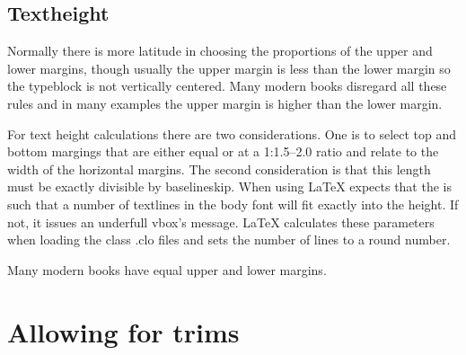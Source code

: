 \subsection{Textheight}
Normally there is more latitude in choosing the 
proportions 
of the upper and lower margins, though usually the upper 
margin is less than the lower margin
so the typeblock is not vertically centered. Many modern books disregard all these rules and in many examples the upper margin is higher than the lower margin.

For text height calculations there are two considerations. One is to select top and bottom margings that are either equal or at a 1:1.5--2.0 ratio and relate to the width of the horizontal margins. The second consideration is that this length must be exactly divisible by baselineskip. When using  LaTeX expects that the  is such that a number of textlines in the body font will fit exactly into the height. If not, it issues an underfull vbox's message. LaTeX calculates these parameters when loading the class .clo files and sets the number of lines to a round number.

Many modern books have equal upper and lower margins.

\section{Allowing for trims}
\newpage



\newlength\trytextheight@cx
\newlength\tryheadheight@cx
\newlength\tryheadsep@cx
\newlength\tryfootskip@cx

\newlength\trytopmargin@cx


